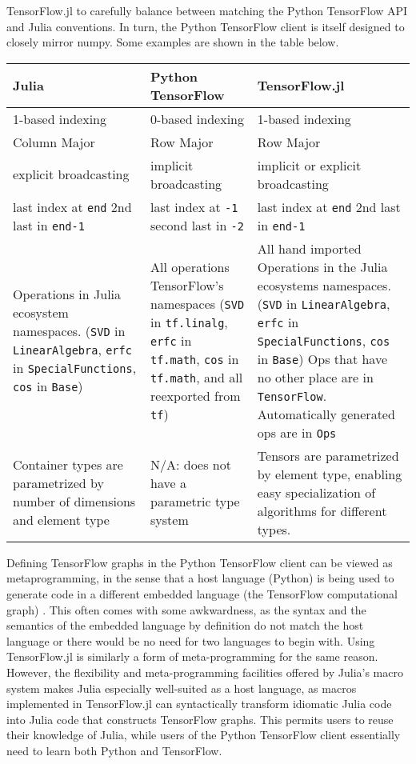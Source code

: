 \documentclass{book}
\begin{document}
\newpage

TensorFlow.jl to carefully balance between matching the Python
TensorFlow API and Julia conventions. In turn, the Python TensorFlow
client is itself designed to closely mirror numpy. Some examples are
shown in the table below.

{	\renewcommand{\arraystretch}{1.5}
\begin{tabularx}{\textwidth}{XXX}
	\toprule
	\textbf{Julia} & \textbf{Python TensorFlow} & \textbf{TensorFlow.jl}\\
	\midrule
	1-based indexing & 0-based indexing & 1-based indexing \\
	Column Major & Row Major & Row Major \\
	explicit broadcasting & implicit broadcasting & implicit or explicit broadcasting \\
	last index at \texttt{end} 2nd last in \texttt{end-1} & last index at \texttt{-1} second last in \texttt{-2} & last index at \texttt{end} 2nd last in \texttt{end-1} \\
	Operations in Julia ecosystem namespaces. (\texttt{SVD} in \texttt{LinearAlgebra}, \texttt{erfc} in \texttt{SpecialFunctions}, \texttt{cos} in \texttt{Base}) & All operations TensorFlow's namespaces (\texttt{SVD} in \texttt{tf.linalg}, \texttt{erfc} in \texttt{tf.math}, \texttt{cos} in \texttt{tf.math}, and all reexported from \texttt{tf}) & All hand imported Operations in the Julia ecosystems namespaces. (\texttt{SVD} in \texttt{LinearAlgebra}, \texttt{erfc} in \texttt{SpecialFunctions}, \texttt{cos} in \texttt{Base}) Ops that have no other place are in \texttt{TensorFlow}. Automatically generated ops are in \texttt{Ops} \\

	Container types are parametrized by number of dimensions and element type & N/A: does not have a parametric type system & Tensors are parametrized by element type, enabling easy specialization of algorithms for different types. \\
	\bottomrule
\end{tabularx}
}

Defining TensorFlow graphs in the Python TensorFlow client can be viewed
as metaprogramming, in the sense that a host language (Python) is being
used to generate code in a different embedded language (the TensorFlow
computational graph) \citep{MLandPL}. This often comes with some
awkwardness, as the syntax and the semantics of the embedded language by
definition do not match the host language or there would be no need for
two languages to begin with. Using TensorFlow.jl is similarly a form of
meta-programming for the same reason. However, the flexibility and
meta-programming facilities offered by Julia's macro system makes Julia
especially well-suited as a host language, as macros implemented in
TensorFlow.jl can syntactically transform idiomatic Julia code into
Julia code that constructs TensorFlow graphs. This permits users to
reuse their knowledge of Julia, while users of the Python TensorFlow
client essentially need to learn both Python and TensorFlow.
\end{document}
